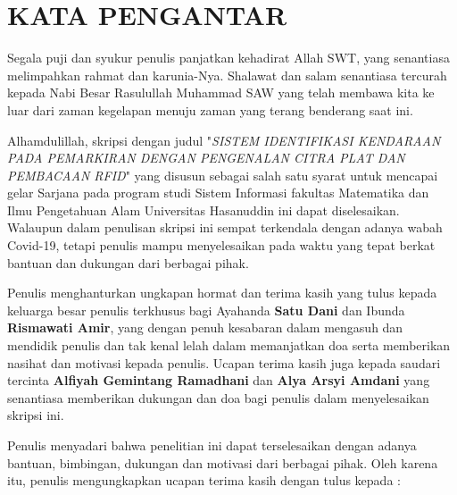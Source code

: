 \chapter*{KATA PENGANTAR}

Segala puji dan syukur penulis panjatkan kehadirat Allah SWT, yang senantiasa melimpahkan rahmat dan karunia-Nya. Shalawat dan salam senantiasa tercurah kepada Nabi Besar Rasulullah Muhammad SAW yang telah membawa kita ke luar dari zaman kegelapan menuju zaman yang terang benderang saat ini. 

Alhamdulillah, skripsi dengan judul "\textit{SISTEM IDENTIFIKASI KENDARAAN PADA PEMARKIRAN DENGAN PENGENALAN CITRA PLAT DAN PEMBACAAN RFID}" yang disusun sebagai salah satu syarat untuk mencapai gelar Sarjana pada program studi Sistem Informasi fakultas Matematika dan Ilmu Pengetahuan Alam Universitas Hasanuddin ini dapat diselesaikan. Walaupun dalam penulisan skripsi ini sempat terkendala dengan adanya wabah Covid-19, tetapi penulis mampu menyelesaikan pada waktu yang tepat berkat bantuan dan dukungan dari berbagai pihak.

Penulis menghanturkan ungkapan hormat dan terima kasih yang tulus kepada keluarga besar penulis terkhusus bagi Ayahanda \textbf{Satu Dani} dan Ibunda \textbf{Rismawati Amir}, yang dengan penuh kesabaran dalam mengasuh dan mendidik penulis dan tak kenal lelah dalam memanjatkan doa serta memberikan nasihat dan motivasi kepada penulis. Ucapan terima kasih juga kepada saudari tercinta \textbf{Alfiyah Gemintang Ramadhani} dan \textbf{Alya Arsyi Amdani} yang senantiasa memberikan dukungan dan doa bagi penulis dalam menyelesaikan skripsi ini.

Penulis menyadari bahwa penelitian ini dapat terselesaikan dengan adanya bantuan, bimbingan, dukungan dan motivasi dari berbagai pihak. Oleh karena itu, penulis mengungkapkan ucapan terima kasih dengan tulus kepada :

